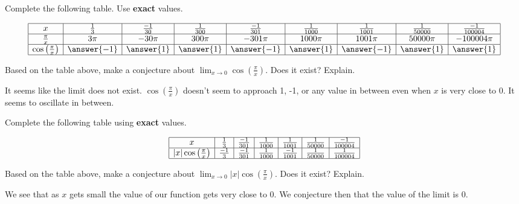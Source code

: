 \documentclass{ximera}
\author{Nela Lakos \and Kyle Parsons}
\begin{document}
\begin{exercise}

Complete the following table.  Use \textbf{exact} values.

\[
\begin{array}{|c|c|c|c|c|c|c|c|c|}
\hline
x & \frac{1}{3} & \frac{-1}{30} & \frac{1}{300} & \frac{-1}{301} & \frac{1}{1000} & \frac{1}{1001} & \frac{1}{50000} & \frac{-1}{100004}\\\hline
\frac{\pi}{x} & 3\pi & -30\pi & 300\pi & -301\pi & 1000\pi & 1001\pi & 50000\pi & -100004\pi \\\hline
\cos\left(\frac{\pi}{x}\right) & \answer{-1} & \answer{1} & \answer{1} & \answer{-1} & \answer{1} & \answer{-1} & \answer{1} & \answer{1} \\\hline
\end{array}
\]

\begin{question}
Based on the table above, make a conjecture about $\lim_{x\to0}\cos\left(\frac{\pi}{x}\right)$.  Does it exist? Explain.
\begin{freeResponse}
It seems like the limit does not exist.  $\cos\left(\frac{\pi}{x}\right)$ doesn't seem to approach 1, -1, or any value in between even when $x$ is very close to 0.  It seems to oscillate in between.
\end{freeResponse}
\end{question}

\begin{exercise}

Complete the following table using \textbf{exact} values.

\[
\begin{array}{|c|c|c|c|c|c|c|}
\hline
x & \frac{1}{3} & \frac{-1}{301} & \frac{1}{1000} & \frac{1}{1001} & \frac{1}{50000} & \frac{-1}{100004}\\\hline
\left|x\right|\cos\left(\frac{\pi}{x}\right) & \frac{-1}{3} & \frac{-1}{301} & \frac{1}{1000} & \frac{-1}{1001} & \frac{1}{50000} & \frac{1}{100004}\\\hline
\end{array}
\]

\begin{question}
Based on the table above, make a conjecture about $\lim_{x\to0}\left|x\right|\cos\left(\frac{\pi}{x}\right)$.  Does it exist?  Explain.
\begin{freeResponse}
We see that as $x$ gets small the value of our function gets very close to 0.  We conjecture then that the value of the limit is 0.
\end{freeResponse}
\end{question}


\end{exercise}
\end{exercise}
\end{document}
